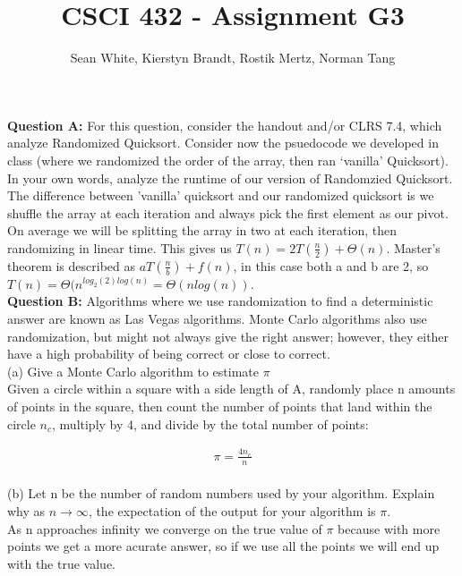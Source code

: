 \documentclass[12pt]{article}
\author{Sean White, Kierstyn Brandt, Rostik Mertz, Norman Tang}
\title{CSCI 432 - Assignment G3}
\begin{document}
\maketitle

\noindent
\textbf{Question A:} For this question, consider the handout and/or CLRS 7.4, which analyze Randomized Quicksort. Consider now the psuedocode we developed in class (where we randomized the order of the array, then ran ‘vanilla’ Quicksort). In your own words, analyze the runtime of our version of Randomzied Quicksort.\\

The difference between 'vanilla' quicksort and our randomized quicksort is we shuffle the array at each iteration and always pick the first element as our pivot. On average we will be splitting the array in two at each iteration, then randomizing in linear time. This gives us $T(n) = 2T(\frac{n}{2}) + \Theta(n)$. Master's theorem is described as $aT(\frac{n}{b}) +f(n)$, in this case both a and b are 2, so $T(n) = \Theta(n^{log_2 (2)log(n)} = \Theta(n log(n))$.\\ 

\noindent
\textbf{Question B:} Algorithms where we use randomization to find a deterministic answer are known as Las Vegas algorithms. Monte Carlo algorithms also use randomization, but might not always give the right answer; however, they either have a high probability of being correct or close to correct.\\

\noindent
(a) Give a Monte Carlo algorithm to estimate $\pi$\\

Given a circle within a square with a side length of A, randomly place n amounts of points in the square, then count the number of points that land within the circle $n_c$, multiply by 4, and divide by the total number of points: 

\begin{align*}
\pi = \frac{4n_c}{n}
\end{align*} \\

\noindent
(b) Let n be the number of random numbers used by your algorithm. Explain why as $n \rightarrow \infty$, the expectation of the output for your algorithm is $\pi$.\\

As n approaches infinity we converge on the true value of $\pi$ because with more points we get a more acurate answer, so if we use all the points we will end up with the true value.\\
\end{document}
